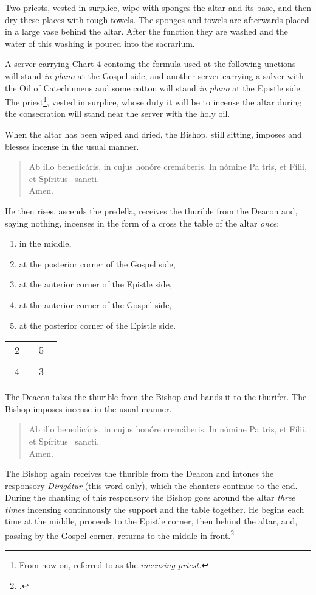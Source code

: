 \documentclass[letterpaper]{report}
\newcommand\blessincense{
\begin{quote}
   Ab illo benedicáris, in cujus honóre cremáberis. In nómine Pa\cross
    tris, et Fí\cross lii, et Spíritus \cross\ sancti. \\ \rbar Amen.
\end{quote}
}
\newcommand\crossplan{
\begin{center}
    \begin{tabular}{ | l c r | }
       \hline
        \cross\ {\tiny 2} &         & {\tiny 5} \cross\ \\
                           & \cross &           \\
        \cross\ {\tiny 4} &         & {\tiny 3} \cross\ \\
       \hline
   \end{tabular} 
\end{center}
}
\begin{document}
{    \rubric Two priests, vested in surplice, wipe with sponges the altar and
    its base, and then dry these places with rough towels. The sponges and
    towels are afterwards placed in a large vase behind the altar. After the
    function they are washed and the water of this washing is poured into the
    sacrarium.

    \rubric A server carrying Chart 4 containg the formula used at the
    following unctions will stand \textit{in plano} at the Gospel side, and
    another server carrying a salver with the Oil of Catechumens and some
    cotton will stand \textit{in plano} at the Epistle side. The
    priest\footnote{From now on, referred to as the \textit{incensing
    priest.}}, vested in surplice, whose duty it will be to incense the altar
    during the consecration will stand near the server with the holy oil.

    \rubric When the altar has been wiped and dried, the Bishop, still sitting,
    imposes and blesses incense in the usual manner. 

    \blessincense

    He then rises, ascends the predella, receives the thurible from the Deacon
    and, saying nothing, incenses in the form of a cross the table of the altar
    \textit{once}: 

    \begin{enumerate}
        \item in the middle,
        \item at the posterior corner of the Gospel side,
        \item at the anterior corner of the Epistle side,
        \item at the anterior corner of the Gospel side,
        \item at the posterior corner of the Epistle side.
    \end{enumerate}

    \crossplan

    \rubric The Deacon takes the thurible from the Bishop and hands it to the
    thurifer. The Bishop imposes incense in the usual manner.

    \blessincense

    The Bishop again receives the thurible from the Deacon and intones the
    responsory \textit{Dirig\'atur} (this word only), which the chanters
    continue to the end. During the chanting of this responsory the Bishop goes
    around the altar \textit{three times} incensing continuously the support
    and the table together. He begins each time at the middle, proceeds to the
    Epistle corner, then behind the altar, and, passing by the Gospel corner,
    returns to the middle in front.\footcite[If the back of the altar is
    attached to the wall, he begins at the middle, incenses the support as fas
    as the Epistle corner, afterwards the table from the Epistle to the Gospel
    side, then the side of the altar at the Gospel side, then the side of the
    altar at the Gospel corner and finally the support from the Gospel corner
    to the middle.][footnote 1, p. 96.]{consecranda}

}
\end{document}
